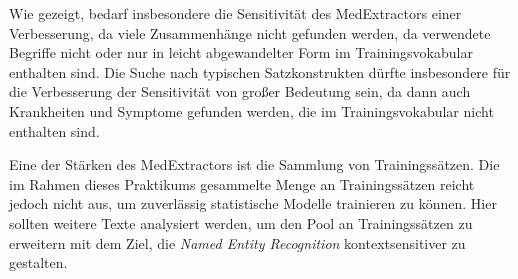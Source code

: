 Wie gezeigt, bedarf insbesondere die Sensitivität des MedExtractors einer Verbesserung, da viele Zusammenhänge nicht gefunden werden, da verwendete Begriffe nicht oder nur in leicht abgewandelter Form im Trainingsvokabular enthalten sind. Die Suche nach typischen Satzkonstrukten dürfte insbesondere für die Verbesserung der Sensitivität von großer Bedeutung sein, da dann auch Krankheiten und Symptome gefunden werden, die im Trainingsvokabular nicht enthalten sind.

Eine der Stärken des MedExtractors ist die Sammlung von Trainingssätzen. Die im Rahmen dieses Praktikums gesammelte Menge an Trainingssätzen reicht jedoch nicht aus, um zuverlässig statistische Modelle trainieren zu können. Hier sollten weitere Texte analysiert werden, um den Pool an Trainingssätzen zu erweitern mit dem Ziel, die \emph{Named Entity Recognition} kontextsensitiver zu gestalten. 